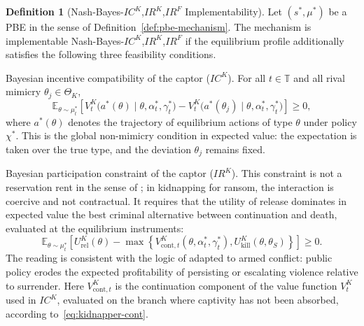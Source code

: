 \documentclass[ecta,nameyear,draft]{econsocart}
\providecommand{\textcite}{\citet}
\theoremstyle{plain}
\theoremstyle{definition}
\newtheorem{definition}[theorem]{Definition}
\newcommand{\ThetaK}{\Theta_K}
\newcommand{\1}{\mathbf{1}}
\begin{document}
\begin{definition}[Nash-Bayes-$IC^K$,$IR^K$,$IR^F$ Implementability]
\label{def:implementable-mechanism}
Let $(s^\ast,\mu^\ast)$ be a PBE in the sense of Definition~\ref{def:pbe-mechanism}. The mechanism is implementable Nash-Bayes-$IC^K$,$IR^K$,$IR^F$ if the equilibrium profile additionally satisfies the following three feasibility conditions.

\smallskip
\noindent Bayesian incentive compatibility of the captor \textup{(}$IC^K$\textup{)}. For all $t\in\mathbb{T}$ and all rival mimicry $\theta_j\in\ThetaK$,
\[
\mathbb{E}_{\theta\sim\mu_t^\ast}
\left[
V^K_t\!\bigl(a^\ast(\theta)\mid \theta,\alpha_t^\ast,\gamma_t^\ast\bigr)
-
V^K_t\!\bigl(a^\ast(\theta_j)\mid \theta,\alpha_t^\ast,\gamma_t^\ast\bigr)
\right]
\ge 0,
\]
where $a^\ast(\theta)$ denotes the trajectory of equilibrium actions of type $\theta$ under policy $\chi^\ast$. This is the global non-mimicry condition in expected value: the expectation is taken over the true type, and the deviation $\theta_j$ remains fixed.

\smallskip
\noindent Bayesian participation constraint of the captor \textup{(}$IR^K$\textup{)}. This constraint is not a reservation rent in the sense of \textcite{Myerson1979IC}; in kidnapping for ransom, the interaction is coercive and not contractual. It requires that the utility of release dominates in expected value the best criminal alternative between continuation and death, evaluated at the equilibrium instruments:
\[
\mathbb{E}_{\theta\sim\mu_t^\ast}
\left[
U^K_{\mathrm{rel}}(\theta)
-
\max\left\{
V^K_{\mathrm{cont},t}(\theta,\alpha_t^\ast,\gamma_t^\ast),
U^K_{\mathrm{kill}}(\theta,\theta_S)
\right\}
\right]
\ge0.
\]
The reading is consistent with the logic of \textcite{Becker1968} adapted to armed conflict: public policy erodes the expected profitability of persisting or escalating violence relative to surrender. Here $V^K_{\mathrm{cont},t}$ is the continuation component of the value function $V^K_t$ used in $IC^K$, evaluated on the branch where captivity has not been absorbed, according to~\eqref{eq:kidnapper-cont}.


\end{definition}
\end{document}
